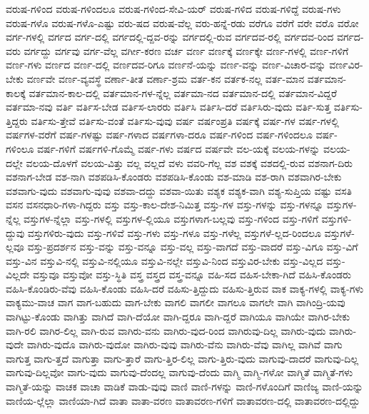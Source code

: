 {ವರುಷ-ಗಳಿಂದ
ವರುಷ-ಗಳಿಂದಲೂ
ವರುಷ-ಗಳಿಂದ-ಸೇವಿ-ಯರ್
ವರುಷ-ಗಳಿದ
ವರುಷ-ಗಳಿದ್ದೆ
ವರುಷ-ಗಳು
ವರುಷ-ಗಳೊ
ವರುಷ-ಗಳೊ-ಎಷ್ಟು
ವರು-ಷದ
ವರುಷ-ವೆಲ್ಲ
ವರು-ಹನ್ನೆ-ರಡು
ವರೆಗೂ
ವರೆಗೆ
ವರೇ
ವರೊ
ವರೋ
ವರ್ಗ-ಗಳಲ್ಲಿ
ವರ್ಗದ
ವರ್ಗ-ದಲ್ಲಿ
ವರ್ಗದಲ್ಲಿ-ದ್ದವ-ರನ್ನು
ವರ್ಗದಲ್ಲಿ-ರುವ
ವರ್ಗದವ-ರಲ್ಲಿ
ವರ್ಗದವ-ರಿಂದ
ವರ್ಗದ-ವರು
ವರ್ಗದ್ದು
ವರ್ಗವು
ವರ್ಗ-ವೆಲ್ಲ
ವರ್ಗೀ-ಕರಣ
ವರ್ಚ
ವರ್ಣ
ವರ್ಣಕ್ಕೆ
ವರ್ಣಕ್ಕೇ
ವರ್ಣ-ಗಳಲ್ಲಿ
ವರ್ಣ-ಗಳಿಗೆ
ವರ್ಣ-ಗಳು
ವರ್ಣದ
ವರ್ಣ-ದಲ್ಲಿ
ವರ್ಣದವ-ರಿಗೂ
ವರ್ಣನೆ-ಯನ್ನು
ವರ್ಣ-ವನ್ನು
ವರ್ಣ-ವಿಚಾರ-ವನ್ನು
ವರ್ಣವಿರ-ಬೇಕು
ವರ್ಣವೇ
ವರ್ಣ-ವ್ಯವಸ್ಥೆ
ವರ್ಣಾ-ತೀತ
ವರ್ಣಾ-ಶ್ರಮ
ವರ್ತ-ಕನ
ವರ್ತಕ-ನಲ್ಲ
ವರ್ತ-ಮಾನ
ವರ್ತಮಾನ-ಕಾಲಕ್ಕೆ
ವರ್ತಮಾನ-ಕಾಲ-ದಲ್ಲಿ
ವರ್ತಮಾನ-ಗಳ-ನ್ನೆಲ್ಲ
ವರ್ತಮಾ-ನದ
ವರ್ತಮಾನ-ದಲ್ಲಿ
ವರ್ತಮಾನ-ವಿದ್ದರೆ
ವರ್ತಮಾ-ನವು
ವರ್ತಿ
ವರ್ತಿಸ-ಬೇಡ
ವರ್ತಿಸ-ಲಾರರು
ವರ್ತಿಸಿ
ವರ್ತಿಸಿ-ದರೆ
ವರ್ತಿಸಿರು-ವುದು
ವರ್ತಿ-ಸುತ್ತ
ವರ್ತಿಸು-ತ್ತಿದ್ದರು
ವರ್ತಿಸು-ತ್ತೇವೆ
ವರ್ತಿಸು-ವಂತೆ
ವರ್ತಿಸು-ವುವು
ವರ್ಷ
ವರ್ಷಂಪ್ರತಿ
ವರ್ಷಕ್ಕೆ
ವರ್ಷ-ಗಳ
ವರ್ಷ-ಗಳಲ್ಲಿ
ವರ್ಷಗಳ-ವರೆಗೆ
ವರ್ಷ-ಗಳಷ್ಟು
ವರ್ಷ-ಗಳಾದ
ವರ್ಷಗಳಾ-ದರೂ
ವರ್ಷ-ಗಳಿಂದ
ವರ್ಷ-ಗಳಿಂದಲೂ
ವರ್ಷ-ಗಳಿಂಲೂ
ವರ್ಷ-ಗಳಿಗೆ
ವರ್ಷಗಳಿ-ಗೊಮ್ಮೆ
ವರ್ಷ-ಗಳು
ವರ್ಷದ
ವರ್ಷವೇ
ವಲ-ಯಕ್ಕೆ
ವಲಯ-ಗಳನ್ನು
ವಲಯ-ದಲ್ಲೇ
ವಲಯ-ದೊಳಗೆ
ವಲಯ-ವಿತ್ತು
ವಲ್ಲ
ವಲ್ಲದೆ
ವಳು
ವವರಿ-ಗೆಲ್ಲ
ವಶ
ವಶಕ್ಕೆ
ವಶದಲ್ಲಿ-ರುವ
ವಶನಾಗ-ದಿರು
ವಶನಾಗ-ಬೇಡ
ವಶ-ನಾಗಿ
ವಶಪಡಿಸಿ-ಕೊಂಡರು
ವಶಪಡಿಸಿ-ಕೊಂಡು
ವಶ-ಮಾಡಿ
ವಶ-ರಾಗಿ
ವಶವಾಗಿರ-ಬೇಕು
ವಶವಾಗು-ವುದು
ವಶವಾಗು-ವುವು
ವಶವಾ-ದದ್ದು
ವಶವಾ-ಯಿತು
ವಶ್ಯಕ
ವಶ್ಯಕ-ವಾಗಿ
ವಶ್ಯ-ಸುಪ್ತಿಯ
ವಷ್ಟು
ವಸತಿ
ವಸನ
ವಸನಧಾರಿ-ಗಳಾ-ಗಿದ್ದರು
ವಸ್ತು
ವಸ್ತು-ಕಾಲ-ದೇಶ-ನಿಮಿತ್ತ
ವಸ್ತು-ಗಳ
ವಸ್ತು-ಗಳನ್ನು
ವಸ್ತು-ಗಳನ್ನೂ
ವಸ್ತುಗಳ-ನ್ನೆಲ್ಲ
ವಸ್ತುಗಳ-ನ್ನೆಲ್ಲಾ
ವಸ್ತು-ಗಳಲ್ಲಿ
ವಸ್ತುಗಳ-ಲ್ಲಿಯೂ
ವಸ್ತುಗಳಾಗ-ಬಲ್ಲವು
ವಸ್ತು-ಗಳಿಂದ
ವಸ್ತು-ಗಳಿಗೆ
ವಸ್ತುಗಳಿ-ದ್ದುವು
ವಸ್ತುಗಳಿರು-ವುದು
ವಸ್ತು-ಗಳಿವೆ
ವಸ್ತು-ಗಳು
ವಸ್ತು-ಗಳೂ
ವಸ್ತು-ಗಳೆಲ್ಲ
ವಸ್ತುಗಳೆ-ಲ್ಲದ-ರಿಂದಲೂ
ವಸ್ತುಗಳೆ-ಲ್ಲವೂ
ವಸ್ತು-ಪ್ರದರ್ಶನ
ವಸ್ತು-ವನ್ನು
ವಸ್ತು-ವನ್ನೂ
ವಸ್ತು-ವಲ್ಲ
ವಸ್ತು-ವಾಗದೆ
ವಸ್ತು-ವಾದರೆ
ವಸ್ತು-ವಿಗೂ
ವಸ್ತು-ವಿಗೆ
ವಸ್ತು-ವಿನ
ವಸ್ತುವಿ-ನಲ್ಲಿ
ವಸ್ತುವಿ-ನಲ್ಲಿಯೂ
ವಸ್ತುವಿ-ನಲ್ಲೇ
ವಸ್ತುವಿ-ನಿಂದ
ವಸ್ತುವಿರ-ಬೇಕು
ವಸ್ತು-ವಿಲ್ಲದ
ವಸ್ತು-ವಿಲ್ಲದೇ
ವಸ್ತುವೂ
ವಸ್ತುವೋ
ವಸ್ತು-ಸ್ಥಿತಿ
ವಸ್ತ್ರ
ವಸ್ತ್ರದ
ವಸ್ತ್ರ-ವನ್ನೂ
ವಹಿ-ಸದ
ವಹಿಸ-ಬೇಕಾ-ಗಿದೆ
ವಹಿಸಿ-ಕೊಂಡರು
ವಹಿಸಿ-ಕೊಂಡಿರು-ವೆವು
ವಹಿಸಿ-ಕೊಂಡು
ವಹಿಸಿ-ದರೆ
ವಹಿಸು-ತ್ತಿದ್ದುದು
ವಹಿಸು-ತ್ತಿರುವ
ವಾಕ
ವಾಕ್ಯ-ಗಳಲ್ಲಿ
ವಾಕ್ಯ-ಗಳು
ವಾಕ್ಯಮು-ವಾಚ
ವಾಗ
ವಾಗ-ಬಹುದು
ವಾಗ-ಬೇಕು
ವಾಗಲಿ
ವಾಗಲೀ
ವಾಗಲೂ
ವಾಗಲೇ
ವಾಗಿ
ವಾಗಿಂದ್ರಿ-ಯವು
ವಾಗಿಟ್ಟು-ಕೊಂಡು
ವಾಗಿತ್ತು
ವಾಗಿದೆ
ವಾಗಿ-ದೆಯೋ
ವಾಗಿ-ದ್ದರೂ
ವಾಗಿ-ದ್ದರೆ
ವಾಗಿಯೂ
ವಾಗಿಯೇ
ವಾಗಿರ-ಬೇಕು
ವಾಗಿ-ರಲಿ
ವಾಗಿರ-ಲಿಲ್ಲ
ವಾಗಿ-ರುವ
ವಾಗಿರು-ವನು
ವಾಗಿರು-ವುದ-ರಿಂದ
ವಾಗಿರುವು-ದಿಲ್ಲ
ವಾಗಿರು-ವುದು
ವಾಗಿರು-ವುದೇ
ವಾಗಿರು-ವುದೊ
ವಾಗಿರು-ವುದೋ
ವಾಗಿರು-ವುವು
ವಾಗಿರು-ವೆನು
ವಾಗಿರು-ವೆವು
ವಾಗಿಲ್ಲ
ವಾಗಿವೆ
ವಾಗು
ವಾಗುತ್ತ
ವಾಗು-ತ್ತದೆ
ವಾಗುತ್ತಾ
ವಾಗು-ತ್ತಾರೆ
ವಾಗು-ತ್ತಿರ-ಲಿಲ್ಲ
ವಾಗು-ತ್ತಿರು-ವುದು
ವಾಗುವು-ದಾದರೆ
ವಾಗುವು-ದಿಲ್ಲ
ವಾಗುವು-ದಿಲ್ಲವೋ
ವಾಗು-ವುದು
ವಾಗುವು-ದೆಂದಲ್ಲ
ವಾಗುವು-ದೆಂದು
ವಾಗ್ಮಿ
ವಾಗ್ಮಿ-ಗಳೋ
ವಾಗ್ಮಿತೆ
ವಾಗ್ಮಿತೆ-ಗಳು
ವಾಗ್ಮಿತೆ-ಯನ್ನು
ವಾಚಕ
ವಾಚಾ
ವಾಡಿಕೆ
ವಾಡು-ವುವು
ವಾಣಿ
ವಾಣಿ-ಗಳನ್ನು
ವಾಣಿ-ಗಳೊಂದಿಗೆ
ವಾಣಿಜ್ಯ
ವಾಣಿ-ಯನ್ನು
ವಾಣಿಯ-ಲ್ಲೆಲ್ಲಾ
ವಾಣಿಯಾ-ಗಿದೆ
ವಾತಾ
ವಾತಾ-ವರಣ
ವಾತಾವರಣ-ಗಳಿಗೆ
ವಾತಾವರಣ-ದಲ್ಲಿ
ವಾತಾವರಣ-ದಲ್ಲಿದ್ದು
}
